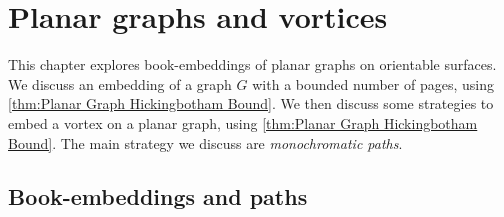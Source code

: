 \chapter{Planar graphs and vortices}\label{chap:planar}

This chapter explores book-embeddings of planar graphs on orientable surfaces. 
We discuss an embedding of a graph $G$ with a bounded number of pages, using \cref{thm:Planar Graph Hickingbotham Bound}. We then discuss some strategies to embed a vortex on a planar graph, using \cref{thm:Planar Graph Hickingbotham Bound}. The main strategy we discuss are \textit{monochromatic paths}.



\section{Book-embeddings and paths}

